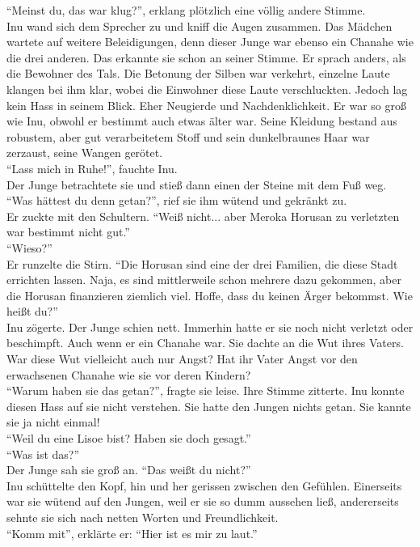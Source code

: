 \documentclass[a4paper,12pt]{book}
\begin{document}
``Meinst du, das war klug?'', erklang plötzlich eine völlig andere Stimme. \\
Inu wand sich dem Sprecher zu und kniff die Augen zusammen. Das Mädchen wartete auf weitere 
Beleidigungen, denn dieser Junge war ebenso ein Chanahe wie die drei anderen. Das erkannte sie 
schon an seiner Stimme. Er sprach anders, als die Bewohner des Tals. Die Betonung der Silben war 
verkehrt, einzelne Laute klangen bei ihm klar, wobei die Einwohner diese Laute verschluckten. 
Jedoch lag kein Hass in seinem Blick. Eher Neugierde und Nachdenklichkeit. Er war so groß wie Inu, 
obwohl er bestimmt auch etwas älter war. Seine Kleidung bestand aus robustem, aber gut verarbeitetem 
Stoff und sein dunkelbraunes Haar war zerzaust, seine Wangen gerötet. \\
``Lass mich in Ruhe!'', fauchte Inu.\\
Der Junge betrachtete sie und stieß dann einen der Steine mit dem Fuß weg. \\
``Was hättest du denn getan?'', rief sie ihm wütend und gekränkt zu.\\
Er zuckte mit den Schultern. ``Weiß nicht... aber Meroka Horusan zu verletzten war bestimmt nicht 
gut.''\\
``Wieso?''\\
Er runzelte die Stirn. ``Die Horusan sind eine der drei Familien, die diese Stadt errichten lassen. 
Naja, es sind mittlerweile schon mehrere dazu gekommen, aber die Horusan finanzieren ziemlich viel. 
Hoffe, dass du keinen Ärger bekommst. Wie heißt du?''\\
Inu zögerte. Der Junge schien nett. Immerhin hatte er sie noch nicht verletzt oder beschimpft. Auch 
wenn er ein Chanahe war. Sie dachte an die Wut ihres Vaters. War diese Wut vielleicht auch nur 
Angst? Hat ihr Vater Angst vor den erwachsenen Chanahe wie sie vor deren Kindern? \\
``Warum haben sie das getan?'', fragte sie leise. Ihre Stimme zitterte. Inu konnte diesen Hass auf 
sie nicht verstehen. Sie hatte den Jungen nichts getan. Sie kannte sie ja nicht einmal!\\
``Weil du eine Lisoe bist? Haben sie doch gesagt.''\\
``Was ist das?''\\
Der Junge sah sie groß an. ``Das weißt du nicht?''\\
Inu schüttelte den Kopf, hin und her gerissen zwischen den Gefühlen. Einerseits war sie wütend auf 
den Jungen, weil er sie so dumm aussehen ließ, andererseits sehnte sie sich nach netten Worten und 
Freundlichkeit. \\
``Komm mit'', erklärte er: ``Hier ist es mir zu laut.''\\
\end{document}
